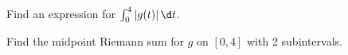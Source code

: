 \documentclass{ximera}
\begin{document}
\begin{exercise}
Find an expression for $\int_0^4 \left|g(t)\right| \d t$.
\begin{multipleChoice}
\end{multipleChoice}

Find the midpoint Riemann sum for $g$ on $[0,4]$ with 2 subintervals.
\begin{multipleChoice}
\end{multipleChoice}

\end{exercise}
\end{document}
